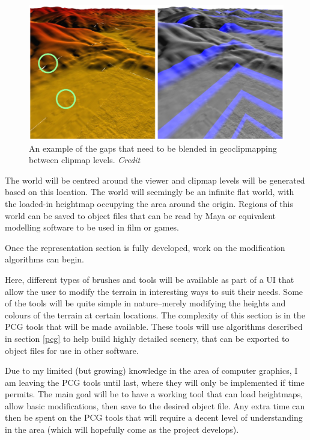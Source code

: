 \documentclass[notitlepage,12pt]{article}
\begin{document}
\begin{figure}[h]
  \centering
  \includegraphics[width=1.0\textwidth]{blen_regions_and_gaps.png}
  \caption{An example of the gaps that need to be blended in geoclipmapping between clipmap levels. \textit{Credit \cite{geoclipmapping}}}
  \label{fig:blending}
\end{figure}

The world will be centred around the viewer and clipmap levels will be generated based on this location. The world will seemingly be an infinite flat world, with the loaded-in heightmap occupying the area around the origin. Regions of this world can be saved to object files that can be read by Maya or equivalent modelling software to be used in film or games.

Once the representation section is fully developed, work on the modification algorithms can begin. 

Here, different types of brushes and tools will be available as part of a UI that allow the user to modify the terrain in interesting ways to suit their needs. Some of the tools will be quite simple in nature--merely modifying the heights and colours of the terrain at certain locations. The complexity of this section is in the PCG tools that will be made available. These tools will use algorithms described in section \ref{pcg} to help build highly detailed scenery, that can be exported to object files for use in other software.

Due to my limited (but growing) knowledge in the area of computer graphics, I am leaving the PCG tools until last, where they will only be implemented if time permits. The main goal will be to have a working tool that can load heightmaps, allow basic modifications, then save to the desired object file. Any extra time can then be spent on the PCG tools that will require a decent level of understanding in the area (which will hopefully come as the project develops).
\end{document}
